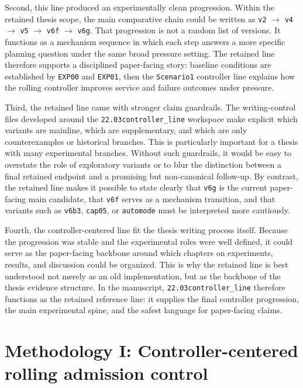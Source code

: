 Second, this line produced an experimentally clean progression. Within the retained thesis scope, the main comparative chain could be written as \texttt{v2} $\rightarrow$ \texttt{v4} $\rightarrow$ \texttt{v5} $\rightarrow$ \texttt{v6f} $\rightarrow$ \texttt{v6g}. That progression is not a random list of versions. It functions as a mechanism sequence in which each step answers a more specific planning question under the same broad pressure setting. The retained line therefore supports a disciplined paper-facing story: baseline conditions are established by \texttt{EXP00} and \texttt{EXP01}, then the \texttt{Scenario1} controller line explains how the rolling controller improves service and failure outcomes under pressure.

Third, the retained line came with stronger claim guardrails. The writing-control files developed around the \texttt{22.03controller\_line} workspace make explicit which variants are mainline, which are supplementary, and which are only counterexamples or historical branches. This is particularly important for a thesis with many experimental branches. Without such guardrails, it would be easy to overstate the role of exploratory variants or to blur the distinction between a final retained endpoint and a promising but non-canonical follow-up. By contrast, the retained line makes it possible to state clearly that \texttt{v6g} is the current paper-facing main candidate, that \texttt{v6f} serves as a mechanism transition, and that variants such as \texttt{v6b3}, \texttt{cap05}, or \texttt{automode} must be interpreted more cautiously.

Fourth, the controller-centered line fit the thesis writing process itself. Because the progression was stable and the experimental roles were well defined, it could serve as the paper-facing backbone around which chapters on experiments, results, and discussion could be organized. This is why the retained line is best understood not merely as an old implementation, but as the backbone of the thesis evidence structure. In the manuscript, \texttt{22.03controller\_line} therefore functions as the retained reference line: it supplies the final controller progression, the main experimental spine, and the safest language for paper-facing claims.

\section{Methodology I: Controller-centered rolling admission control}

